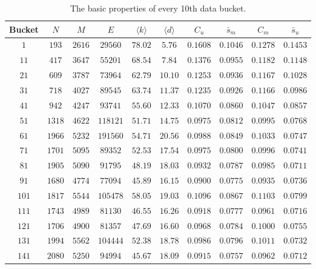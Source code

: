       \begin{table}[h]
        \begin{tabularx}{\textwidth}{|C{1.1}|C{0.95}|C{0.95}|C{1}|C{1}|C{1}|C{1}|C{1}|C{1}|C{1}|} \hline
           \textbf{Bucket} & $N$ & $M$ & $E$ & $\langle k \rangle$ & $\langle d \rangle$ & $C_u$ & $\bar s_m$ & $C_m$ & $\bar s_u$ \\\hline
$1$ & $193$ & $2616$ & $29560$ & $78.02$ & $5.76$ & $0.1608$ & $0.1046$ & $0.1278$ & $0.1453$ \\\hline
$11$ & $417$ & $3647$ & $55201$ & $68.54$ & $7.84$ & $0.1376$ & $0.0955$ & $0.1182$ & $0.1148$ \\\hline
$21$ & $609$ & $3787$ & $73964$ & $62.79$ & $10.10$ & $0.1253$ & $0.0936$ & $0.1167$ & $0.1028$ \\\hline
$31$ & $718$ & $4027$ & $89545$ & $63.74$ & $11.37$ & $0.1235$ & $0.0926$ & $0.1166$ & $0.0986$ \\\hline
$41$ & $942$ & $4247$ & $93741$ & $55.60$ & $12.33$ & $0.1070$ & $0.0860$ & $0.1047$ & $0.0857$ \\\hline
$51$ & $1318$ & $4622$ & $118121$ & $51.71$ & $14.75$ & $0.0975$ & $0.0812$ & $0.0995$ & $0.0768$ \\\hline
$61$ & $1966$ & $5232$ & $191560$ & $54.71$ & $20.56$ & $0.0988$ & $0.0849$ & $0.1033$ & $0.0747$ \\\hline
$71$ & $1701$ & $5095$ & $89352$ & $52.53$ & $17.54$ & $0.0975$ & $0.0800$ & $0.0996$ & $0.0741$ \\\hline
$81$ & $1905$ & $5090$ & $91795$ & $48.19$ & $18.03$ & $0.0932$ & $0.0787$ & $0.0985$ & $0.0711$ \\\hline
$91$ & $1680$ & $4774$ & $77094$ & $45.89$ & $16.15$ & $0.0900$ & $0.0775$ & $0.0935$ & $0.0736$ \\\hline
$101$ & $1817$ & $5544$ & $105478$ & $58.05$ & $19.03$ & $0.1096$ & $0.0867$ & $0.1103$ & $0.0799$ \\\hline
$111$ & $1743$ & $4989$ & $81130$ & $46.55$ & $16.26$ & $0.0918$ & $0.0777$ & $0.0961$ & $0.0716$ \\\hline
$121$ & $1706$ & $4900$ & $81357$ & $47.69$ & $16.60$ & $0.0968$ & $0.0784$ & $0.1000$ & $0.0755$ \\\hline
$131$ & $1994$ & $5562$ & $104444$ & $52.38$ & $18.78$ & $0.0986$ & $0.0796$ & $0.1011$ & $0.0732$ \\\hline
$141$ & $2080$ & $5250$ & $94994$ & $45.67$ & $18.09$ & $0.0915$ & $0.0757$ & $0.0962$ & $0.0712$ \\\hline        \end{tabularx}
        \caption{The basic properties of every 10th data bucket.}
        \label{tab:cs_properties}
      \end{table}


